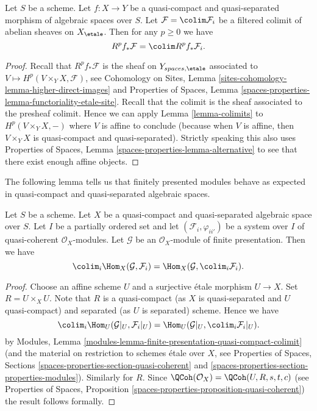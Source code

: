 \begin{lemma}
\label{lemma-colimit-cohomology}
Let $S$ be a scheme. Let $f : X \to Y$ be a quasi-compact and quasi-separated
morphism of algebraic spaces over $S$. Let $\mathcal{F} = \colim \mathcal{F}_i$
be a filtered colimit of abelian sheaves on $X_\etale$.
Then for any $p \geq 0$ we have
$$
R^pf_*\mathcal{F} = \colim R^pf_*\mathcal{F}_i.
$$
\end{lemma}

\begin{proof}
Recall that $R^pf_*\mathcal{F}$ is the sheaf on $Y_{spaces, \etale}$
associated to $V \mapsto H^p(V \times_Y X, \mathcal{F})$, see
Cohomology on Sites, Lemma \ref{sites-cohomology-lemma-higher-direct-images}
and Properties of Spaces, Lemma
\ref{spaces-properties-lemma-functoriality-etale-site}.
Recall that the colimit is the sheaf associated to the presheaf colimit.
Hence we can apply Lemma \ref{lemma-colimits}
to $H^p(V \times_Y X, -)$ where $V$ is affine to conclude (because
when $V$ is affine, then $V \times_Y X$ is quasi-compact and quasi-separated).
Strictly speaking this also uses Properties of Spaces,
Lemma \ref{spaces-properties-lemma-alternative} to see that there exist
enough affine objects.
\end{proof}

\noindent
The following lemma tells us that finitely presented modules behave
as expected in quasi-compact and quasi-separated algebraic spaces.

\begin{lemma}
\label{lemma-finite-presentation-quasi-compact-colimit}
Let $S$ be a scheme. Let $X$ be a quasi-compact and quasi-separated
algebraic space over $S$. Let $I$ be a partially ordered set and
let $(\mathcal{F}_i, \varphi_{ii'})$ be a system over $I$
of quasi-coherent $\mathcal{O}_X$-modules. Let $\mathcal{G}$ be an
$\mathcal{O}_X$-module of finite presentation. Then we have
$$
\colim_i \Hom_X(\mathcal{G}, \mathcal{F}_i)
=
\Hom_X(\mathcal{G}, \colim_i \mathcal{F}_i).
$$
\end{lemma}

\begin{proof}
Choose an affine scheme $U$ and a surjective \'etale morphism
$U \to X$. Set $R = U \times_X U$. Note that $R$ is a quasi-compact
(as $X$ is quasi-separated and $U$ quasi-compact) and separated (as
$U$ is separated) scheme. Hence we have
$$
\colim_i \Hom_U(\mathcal{G}|_U, \mathcal{F}_i|_U)
=
\Hom_U(\mathcal{G}|_U, \colim_i \mathcal{F}_i|_U).
$$
by Modules, Lemma \ref{modules-lemma-finite-presentation-quasi-compact-colimit}
(and the material on restriction to
schemes \'etale over $X$, see
Properties of Spaces, Sections \ref{spaces-properties-section-quasi-coherent}
and \ref{spaces-properties-section-properties-modules}). Similarly for $R$.
Since $\QCoh(\mathcal{O}_X) = \QCoh(U, R, s, t, c)$ (see
Properties of Spaces, Proposition
\ref{spaces-properties-proposition-quasi-coherent})
the result follows formally.
\end{proof}




